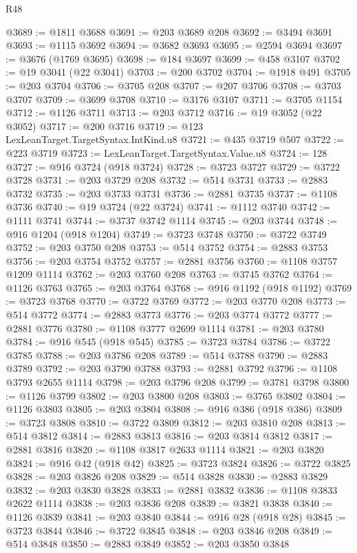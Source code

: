\begin{lexlean}{R48}
\begin{coremodule}
@3689 := @1811 @3688
@3691 := @203 @3689 @208
@3692 := @3494 @3691
@3693 := @1115 @3692
@3694 := @3682 @3693
@3695 := @2594 @3694
@3697 := @3676 (@1769 @3695)
@3698 := @184 @3697
@3699 := @458 @3107
@3702 := @19 @3041 (@22 @3041)
@3703 := @200 @3702
@3704 := @1918 @491
@3705 := @203 @3704
@3706 := @3705 @208
@3707 := @207 @3706
@3708 := @3703 @3707
@3709 := @3699 @3708
@3710 := @3176 @3107
@3711 := @3705 @1154
@3712 := @1126 @3711
@3713 := @203 @3712
@3716 := @19 @3052 (@22 @3052)
@3717 := @200 @3716
@3719 := @123 LexLeanTarget.TargetSyntax.IntKind.u8
@3721 := @435 @3719 @507
@3722 := @223 @3719
@3723 := LexLeanTarget.TargetSyntax.Value.u8
@3724 := 128
@3727 := @916 @3724 (@918 @3724)
@3728 := @3723 @3727
@3729 := @3722 @3728
@3731 := @203 @3729 @208
@3732 := @514 @3731
@3733 := @2883 @3732
@3735 := @203 @3733 @3731
@3736 := @2881 @3735
@3737 := @1108 @3736
@3740 := @19 @3724 (@22 @3724)
@3741 := @1112 @3740
@3742 := @1111 @3741
@3744 := @3737 @3742 @1114
@3745 := @203 @3744
@3748 := @916 @1204 (@918 @1204)
@3749 := @3723 @3748
@3750 := @3722 @3749
@3752 := @203 @3750 @208
@3753 := @514 @3752
@3754 := @2883 @3753
@3756 := @203 @3754 @3752
@3757 := @2881 @3756
@3760 := @1108 @3757 @1209 @1114
@3762 := @203 @3760 @208
@3763 := @3745 @3762
@3764 := @1126 @3763
@3765 := @203 @3764
@3768 := @916 @1192 (@918 @1192)
@3769 := @3723 @3768
@3770 := @3722 @3769
@3772 := @203 @3770 @208
@3773 := @514 @3772
@3774 := @2883 @3773
@3776 := @203 @3774 @3772
@3777 := @2881 @3776
@3780 := @1108 @3777 @2699 @1114
@3781 := @203 @3780
@3784 := @916 @545 (@918 @545)
@3785 := @3723 @3784
@3786 := @3722 @3785
@3788 := @203 @3786 @208
@3789 := @514 @3788
@3790 := @2883 @3789
@3792 := @203 @3790 @3788
@3793 := @2881 @3792
@3796 := @1108 @3793 @2655 @1114
@3798 := @203 @3796 @208
@3799 := @3781 @3798
@3800 := @1126 @3799
@3802 := @203 @3800 @208
@3803 := @3765 @3802
@3804 := @1126 @3803
@3805 := @203 @3804
@3808 := @916 @386 (@918 @386)
@3809 := @3723 @3808
@3810 := @3722 @3809
@3812 := @203 @3810 @208
@3813 := @514 @3812
@3814 := @2883 @3813
@3816 := @203 @3814 @3812
@3817 := @2881 @3816
@3820 := @1108 @3817 @2633 @1114
@3821 := @203 @3820
@3824 := @916 @42 (@918 @42)
@3825 := @3723 @3824
@3826 := @3722 @3825
@3828 := @203 @3826 @208
@3829 := @514 @3828
@3830 := @2883 @3829
@3832 := @203 @3830 @3828
@3833 := @2881 @3832
@3836 := @1108 @3833 @2622 @1114
@3838 := @203 @3836 @208
@3839 := @3821 @3838
@3840 := @1126 @3839
@3841 := @203 @3840
@3844 := @916 @28 (@918 @28)
@3845 := @3723 @3844
@3846 := @3722 @3845
@3848 := @203 @3846 @208
@3849 := @514 @3848
@3850 := @2883 @3849
@3852 := @203 @3850 @3848

\end{coremodule}
\end{lexlean}

